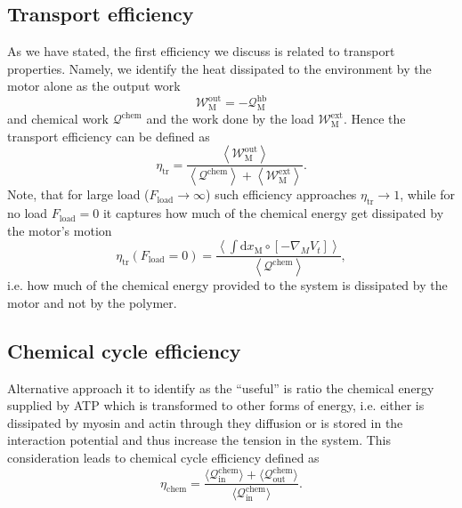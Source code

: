 \documentclass[aps,pre,twocolumn,showpacs,showkeys,superscriptaddress,floatfix]{revtex4-1}
\newcommand{\rmd}{{\mathrm d}}
\begin{document}
\subsection{Transport efficiency} 
As we have stated, the first efficiency we discuss is related to transport properties. 
Namely, we identify the heat dissipated to the environment by the motor alone as the output work 
\[
{\mathcal W}^\text{out}_\text{M} = - {\mathcal Q}^\text{hb}_\text{M} 
\] 
and chemical work $\mathcal Q^\text{chem}$ and the work done by the load $\mathcal W^\text{ext}_\text{M}$.
Hence the transport efficiency can be defined as 
\[
\eta_\text{tr} = \frac{ \left\langle {\mathcal W}^\text{out}_\text{M} \right\rangle }{ \left\langle {\mathcal Q}^\text{chem} \right\rangle + \left\langle {\mathcal W}^\text{ext}_\text{M} \right\rangle } .
\]
Note, that for large load ($F_\text{load} \to \infty$) such efficiency approaches $\eta_\text{tr} \to 1$, 
while for no load $F_\text{load} = 0$ it captures how much of the chemical energy get dissipated by the motor's motion  
\[
\eta_\text{tr}( F_\text{load} = 0 ) = \frac{ \left\langle \int \rmd x_\text{M} \circ \left[ - \nabla_M V_t \right] \right\rangle }{ \left\langle {\mathcal Q}^\text{chem} \right\rangle } ,
\]
i.e. how much of the chemical energy provided to the system is dissipated by the motor and not by the polymer. 


\subsection{Chemical cycle efficiency} %
Alternative approach it to identify as the ``useful'' is ratio the chemical energy supplied by ATP which is transformed to other forms of energy, 
i.e. either is dissipated by myosin and actin through they diffusion or is stored in the interaction potential and thus increase the tension in the system. 
This consideration leads to chemical cycle efficiency defined as 
\begin{equation}
\eta_\text{chem} = \frac{\langle\mathcal Q^\text{chem}_\text{in}\rangle+\langle\mathcal Q^\text{chem}_\text{out}\rangle}{\langle\mathcal Q^\text{chem}_\text{in}\rangle} .
\label{eq:efficiency}
\end{equation}
\end{document}

